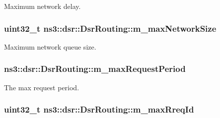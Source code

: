 Maximum network delay. 

\subsubsection[{\texorpdfstring{m\+\_\+max\+Network\+Size}{m_maxNetworkSize}}]{\setlength{\rightskip}{0pt plus 5cm}uint32\+\_\+t ns3\+::dsr\+::\+Dsr\+Routing\+::m\+\_\+max\+Network\+Size\hspace{0.3cm}{\ttfamily [private]}}\hypertarget{classns3_1_1dsr_1_1DsrRouting_ab2edb0a37a59600e15dbb91b5683ad25}{}\label{classns3_1_1dsr_1_1DsrRouting_ab2edb0a37a59600e15dbb91b5683ad25}


Maximum network queue size. 

\subsubsection[{\texorpdfstring{m\+\_\+max\+Request\+Period}{m_maxRequestPeriod}}]{ ns3\+::dsr\+::\+Dsr\+Routing\+::m\+\_\+max\+Request\+Period\hspace{0.3cm}{\ttfamily [private]}}\hypertarget{classns3_1_1dsr_1_1DsrRouting_abce8e7bae58dada0db217ca294cb4c6e}{}\label{classns3_1_1dsr_1_1DsrRouting_abce8e7bae58dada0db217ca294cb4c6e}


The max request period. 

\subsubsection[{\texorpdfstring{m\+\_\+max\+Rreq\+Id}{m_maxRreqId}}]{\setlength{\rightskip}{0pt plus 5cm}uint32\+\_\+t ns3\+::dsr\+::\+Dsr\+Routing\+::m\+\_\+max\+Rreq\+Id\hspace{0.3cm}{\ttfamily [private]}}\hypertarget{classns3_1_1dsr_1_1DsrRouting_a14ef1332178e76768359c27a45db9624}{}\label{classns3_1_1dsr_1_1DsrRouting_a14ef1332178e76768359c27a45db9624}


